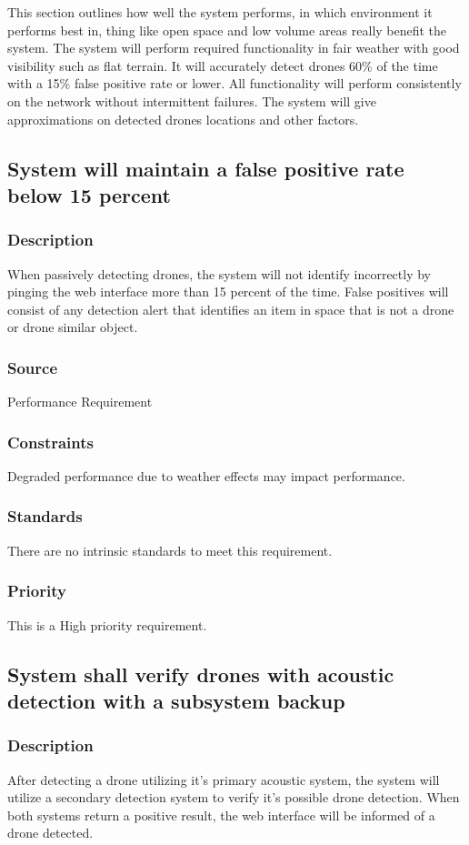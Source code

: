 This section outlines how well the system performs, in which environment it performs best in, thing like open space and low volume areas really benefit the system.  The system will perform required functionality in fair weather with good visibility such as flat terrain. It will accurately detect drones 60\% of the time with a 15\% false positive rate or lower. All functionality will perform consistently on the network without intermittent failures. The system will give approximations on detected drones locations and other factors.

\subsection{System will maintain a false positive rate below 15 percent}
\subsubsection{Description}
When passively detecting drones, the system will not identify incorrectly by pinging the web interface more than 15 percent of the time. False positives will consist of any detection alert that identifies an item in space that is not a drone or drone similar object.
\subsubsection{Source}
Performance Requirement
\subsubsection{Constraints}
Degraded performance due to weather effects may impact performance.
\subsubsection{Standards}
There are no intrinsic standards to meet this requirement.
\subsubsection{Priority}
This is a High priority requirement.

\subsection{System shall verify drones with acoustic detection with a subsystem backup}
\subsubsection{Description}
After detecting a drone utilizing it's primary acoustic system, the system will utilize a secondary detection system to verify it's possible drone detection. When both systems return a positive result, the web interface will be informed of a drone detected.
